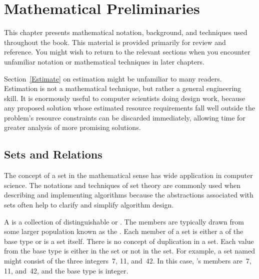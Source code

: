 
\chapter{Mathematical Preliminaries}
\label{MathPre}
\def\CHHEAD{Chap.\ \thechapter\ Mathematical Preliminaries}    %


This chapter presents mathematical notation,
background, and techniques used throughout the book.
This material is provided primarily for review and reference.
You might wish to return to the relevant sections when you encounter
unfamiliar notation or mathematical techniques in later chapters.

Section~\ref{Estimate} on estimation might be unfamiliar to many
readers.
Estimation is not a mathematical technique, but rather a general
engineering skill.
It is enormously useful to computer scientists doing design work,
because any proposed solution whose estimated resource requirements
fall well outside the problem's resource constraints can be
discarded immediately, allowing time for greater analysis of more
promising solutions.

\section{Sets and Relations}
\label{SetDef}

The concept of a set in the mathematical sense has wide
application in computer science.
The notations and techniques of set theory are commonly used
when describing and implementing algorithms because the abstractions
associated with sets often help to clarify and simplify algorithm
design.

A  is a collection of distinguishable
 or .
The members are typically drawn from some larger population known as
the .
Each member of a set is either a  of the
base type or is a set itself.
There is no concept of duplication in a set.
Each value from the base type is either in the set or not in the set.
For example, a set named  might consist of the three
integers~7, 11, and~42.
In this case, 's members are~7, 11, and~42, and the base type is
integer.

